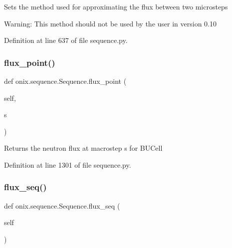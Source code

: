 \begin{DoxyVerb}Sets the method used for approximating the flux between two microsteps

Warning: This method should not be used by the user in version 0.10\end{DoxyVerb}
 

Definition at line 637 of file sequence.\+py.

\mbox{\label{classonix_1_1sequence_1_1Sequence_a4e049d7c4dc532a042da7c4d6297566e}} 
\subsubsection{\texorpdfstring{flux\+\_\+point()}{flux\_point()}}
{\footnotesize\ttfamily def onix.\+sequence.\+Sequence.\+flux\+\_\+point (\begin{DoxyParamCaption}\item[{}]{self,  }\item[{}]{s }\end{DoxyParamCaption})}

\begin{DoxyVerb}Returns the neutron flux at macrostep s for BUCell\end{DoxyVerb}
 

Definition at line 1301 of file sequence.\+py.

\mbox{\label{classonix_1_1sequence_1_1Sequence_a6b1fa0e16ef859ac035ac6b1a77944ad}} 
\subsubsection{\texorpdfstring{flux\+\_\+seq()}{flux\_seq()}\hspace{0.1cm}{\footnotesize\ttfamily [1/2]}}
{\footnotesize\ttfamily def onix.\+sequence.\+Sequence.\+flux\+\_\+seq (\begin{DoxyParamCaption}\item[{}]{self }\end{DoxyParamCaption})}

